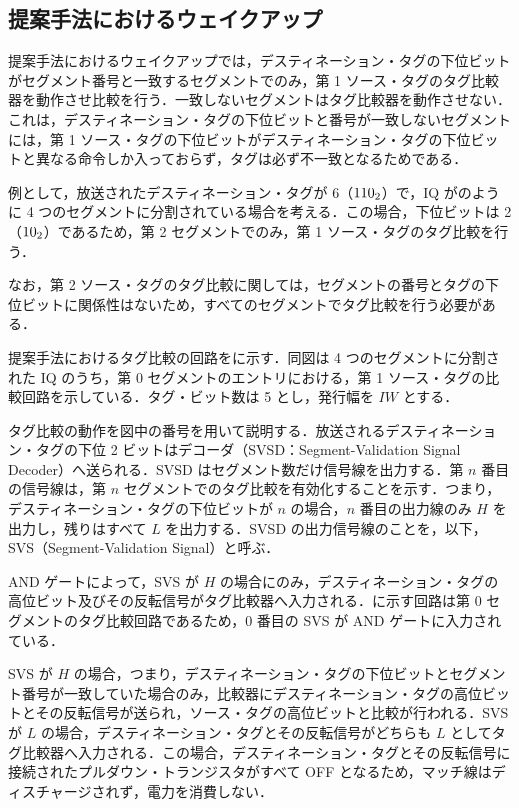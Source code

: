 \subsection{提案手法におけるウェイクアップ}
提案手法におけるウェイクアップでは，デスティネーション・タグの下位ビットがセグメント番号と一致するセグメントでのみ，第 1 ソース・タグのタグ比較器を動作させ比較を行う．一致しないセグメントはタグ比較器を動作させない．これは，デスティネーション・タグの下位ビットと番号が一致しないセグメントには，第 1 ソース・タグの下位ビットがデスティネーション・タグの下位ビットと異なる命令しか入っておらず，タグは必ず不一致となるためである．

例として，放送されたデスティネーション・タグが 6（${\rm 110_2}$）で，IQ がのように 4 つのセグメントに分割されている場合を考える．この場合，下位ビットは 2（${\rm 10_2}$）であるため，第 2 セグメントでのみ，第 1 ソース・タグのタグ比較を行う．

なお，第 2 ソース・タグのタグ比較に関しては，セグメントの番号とタグの下位ビットに関係性はないため，すべてのセグメントでタグ比較を行う必要がある．

提案手法におけるタグ比較の回路をに示す．同図は 4 つのセグメントに分割された IQ のうち，第 0 セグメントのエントリにおける，第 1 ソース・タグの比較回路を示している．タグ・ビット数は 5 とし，発行幅を $IW$ とする．

タグ比較の動作を図中の番号を用いて説明する．放送されるデスティネーション・タグの下位 2 ビットはデコーダ（SVSD：Segment-Validation Signal Decoder）へ送られる．SVSD はセグメント数だけ信号線を出力する．第 $n$ 番目の信号線は，第 $n$ セグメントでのタグ比較を有効化することを示す．つまり，デスティネーション・タグの下位ビットが $n$ の場合，$n$ 番目の出力線のみ $H$ を出力し，残りはすべて $L$ を出力する．SVSD の出力信号線のことを，以下， SVS（Segment-Validation Signal）と呼ぶ．

AND ゲートによって，SVS が $H$ の場合にのみ，デスティネーション・タグの高位ビット及びその反転信号がタグ比較器へ入力される．に示す回路は第 0 セグメントのタグ比較回路であるため，0 番目の SVS が AND ゲートに入力されている．

SVS が $H$ の場合，つまり，デスティネーション・タグの下位ビットとセグメント番号が一致していた場合のみ，比較器にデスティネーション・タグの高位ビットとその反転信号が送られ，ソース・タグの高位ビットと比較が行われる．SVS が $L$ の場合，デスティネーション・タグとその反転信号がどちらも $L$ としてタグ比較器へ入力される．この場合，デスティネーション・タグとその反転信号に接続されたプルダウン・トランジスタがすべて OFF となるため，マッチ線はディスチャージされず，電力を消費しない．

